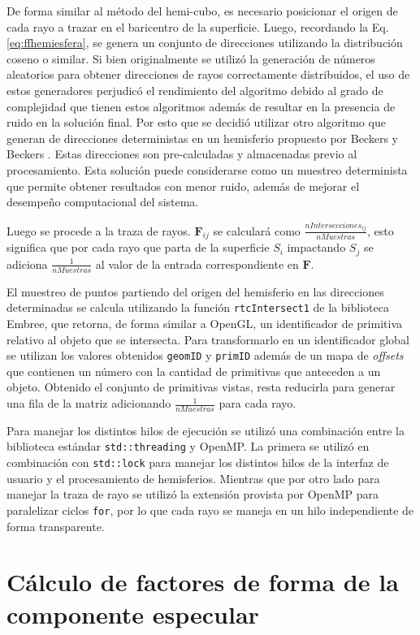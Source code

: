 De forma similar al método del hemi-cubo, es necesario posicionar el origen de cada rayo a trazar en el baricentro de la superficie. Luego, recordando la Eq. \eqref{eq:ffhemiesfera}, se genera un conjunto de direcciones utilizando la distribución coseno o similar. Si bien originalmente se utilizó la generación de números aleatorios para obtener direcciones de rayos correctamente distribuidos, el uso de estos generadores perjudicó el rendimiento del algoritmo debido al grado de complejidad que tienen estos algoritmos además de resultar en la presencia de ruido en la solución final. Por esto que se decidió utilizar otro algoritmo que generan de direcciones deterministas en un hemisferio propuesto por Beckers y Beckers \cite{Beckers}. Estas direcciones son pre-calculadas y almacenadas previo al procesamiento. Esta solución puede considerarse como un muestreo determinista que permite obtener resultados con menor ruido, además de mejorar el desempeño computacional del sistema.

Luego se procede a la traza de rayos. $\mathbf{F}_{ij}$ se calculará como $\frac{nIntersecciones_{ij}}{nMuestras}$, esto significa que por cada rayo que parta de la superficie $S_{i}$ impactando $S_{j}$ se adiciona $\frac{1}{nMuestras}$ al valor de la entrada correspondiente en $\mathbf{F}$.

El muestreo de puntos partiendo del origen del hemisferio en las direcciones determinadas se calcula utilizando la función \verb|rtcIntersect1| de la biblioteca Embree, que retorna, de forma similar a OpenGL, un identificador de primitiva relativo al objeto que se intersecta. Para transformarlo en un identificador global se utilizan los valores obtenidos \verb|geomID| y \verb|primID| además de un mapa de \textit{offsets} que contienen un número con la cantidad de primitivas que anteceden a un objeto. Obtenido el conjunto de primitivas vistas, resta reducirla para generar una fila de la matriz adicionando $\frac{1}{nMuestras}$ para cada rayo.

Para manejar los distintos hilos de ejecución se utilizó una combinación entre la biblioteca estándar \verb|std::threading| y OpenMP. La primera se utilizó en combinación con \verb|std::lock| para manejar los distintos hilos de la interfaz de usuario y el procesamiento de hemisferios. Mientras que por otro lado para manejar la traza de rayo se utilizó la extensión provista por OpenMP para paralelizar ciclos \verb|for|, por lo que cada rayo se maneja en un hilo independiente de forma transparente.

\section{Cálculo de factores de forma de la componente especular}

